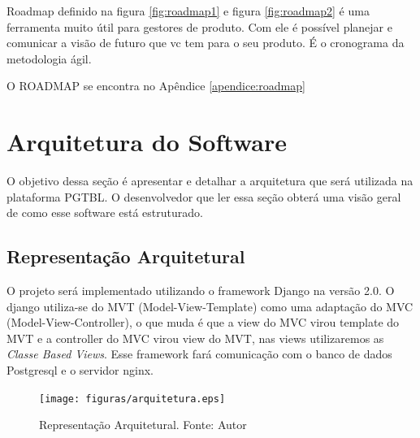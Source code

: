 Roadmap definido na figura \ref{fig:roadmap1} e figura \ref{fig:roadmap2} é uma ferramenta muito útil para gestores de produto. Com ele é possível planejar e comunicar a visão de futuro que vc tem para o seu produto. É o cronograma da metodologia ágil.

O ROADMAP se encontra no Apêndice \ref{apendice:roadmap}

\section{Arquitetura do Software}

O objetivo dessa seção é apresentar e detalhar a arquitetura que será utilizada na plataforma PGTBL. O desenvolvedor que
ler essa seção obterá uma visão geral de como esse software está estruturado.

\subsection{Representação Arquitetural}

O projeto será implementado utilizando o framework Django na versão 2.0. O django utiliza-se do MVT (Model-View-Template) como uma adaptação do MVC (Model-View-Controller), o que muda é que a view do MVC virou template do MVT e a controller do MVC virou view do MVT, nas views utilizaremos as \textit{Classe Based Views}. Esse framework fará comunicação com o banco de dados Postgresql e o servidor nginx.

\begin{figure}[H]
	\centering
  \texttt{[image: figuras/arquitetura.eps]}
  \caption[Representação Arquitetural.]{Representação Arquitetural. Fonte: Autor}
	\label{fig:arquitetura}
\end{figure}

